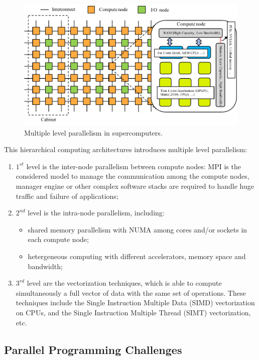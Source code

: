 \begin{figure}[htbp]
	\centering
	\includegraphics[width=6.2in]{fig/supercomputer_arch.pdf}
	\caption{Multiple level parallelism in supercomputers.}
	\label{fig:supercomputer_arch}
\end{figure}

This hierarchical computing architectures introduces multiple level parallelism:

\begin{enumerate}
	\item $1^{st}$ level is the inter-node parallelism between compute nodes: MPI is the considered model to manage the communication among the compute nodes, manager engine or other complex software stacks are required to handle huge traffic and failure of applications;
	\item $2^{nd}$ level is the intra-node parallelism, including:
	\begin{itemize}
		\item shared memory parallelism with NUMA among cores and/or sockets in each compute node;
		\item hetergeneous computing with different accelerators, memory space and bandwidth;
	\end{itemize}
	\item $3^{rd}$ level are the vectorization techniques, which is able to compute simultaneously a full vector of data with the same set of operations. These techniques include the Single Instruction Multiple Data (SIMD) vectorization on CPUs, and the Single Instruction Multiple Thread (SIMT) vectorization, etc.
\end{enumerate}

\subsection{Parallel Programming Challenges} \label{Parallel Programming Challenges}

